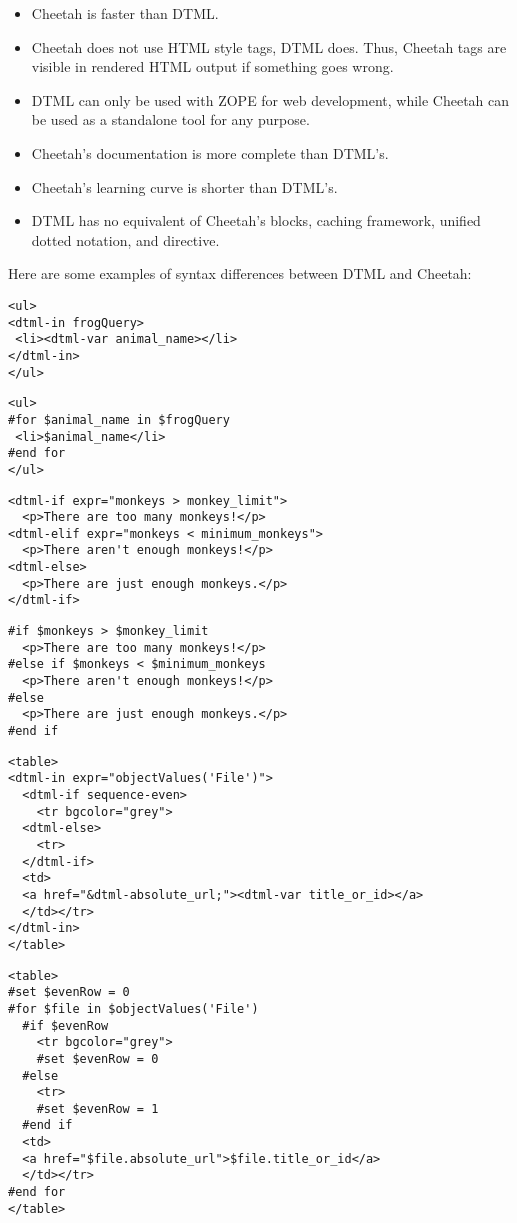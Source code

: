 \begin{itemize}
\item Cheetah is faster than DTML.
\item Cheetah does not use HTML style tags, DTML does.  Thus, Cheetah tags are
     visible in rendered HTML output if something goes wrong.
\item DTML can only be used with ZOPE for web development, while Cheetah can be
     used as a standalone tool for any purpose.
\item Cheetah's documentation is more complete than DTML's.
\item Cheetah's learning curve is shorter than DTML's.
\item DTML has no equivalent of Cheetah's blocks, caching framework, 
     unified dotted notation, and  directive.
\end{itemize}

Here are some examples of syntax differences between DTML and Cheetah:
\begin{verbatim}
<ul>
<dtml-in frogQuery>
 <li><dtml-var animal_name></li>
</dtml-in>
</ul>
\end{verbatim}

\begin{verbatim}
<ul>
#for $animal_name in $frogQuery
 <li>$animal_name</li>
#end for
</ul>
\end{verbatim}

\begin{verbatim}
<dtml-if expr="monkeys > monkey_limit">
  <p>There are too many monkeys!</p>
<dtml-elif expr="monkeys < minimum_monkeys">
  <p>There aren't enough monkeys!</p>
<dtml-else>
  <p>There are just enough monkeys.</p>
</dtml-if>
\end{verbatim}

\begin{verbatim}
#if $monkeys > $monkey_limit
  <p>There are too many monkeys!</p>
#else if $monkeys < $minimum_monkeys
  <p>There aren't enough monkeys!</p>
#else
  <p>There are just enough monkeys.</p>
#end if
\end{verbatim}

\begin{verbatim}
<table>
<dtml-in expr="objectValues('File')">
  <dtml-if sequence-even>
    <tr bgcolor="grey">
  <dtml-else>
    <tr>
  </dtml-if>    
  <td>
  <a href="&dtml-absolute_url;"><dtml-var title_or_id></a>
  </td></tr>
</dtml-in>
</table>
\end{verbatim}

\begin{verbatim}
<table>
#set $evenRow = 0
#for $file in $objectValues('File')
  #if $evenRow
    <tr bgcolor="grey">
    #set $evenRow = 0
  #else
    <tr>
    #set $evenRow = 1
  #end if
  <td>
  <a href="$file.absolute_url">$file.title_or_id</a>
  </td></tr>
#end for
</table>
\end{verbatim}

